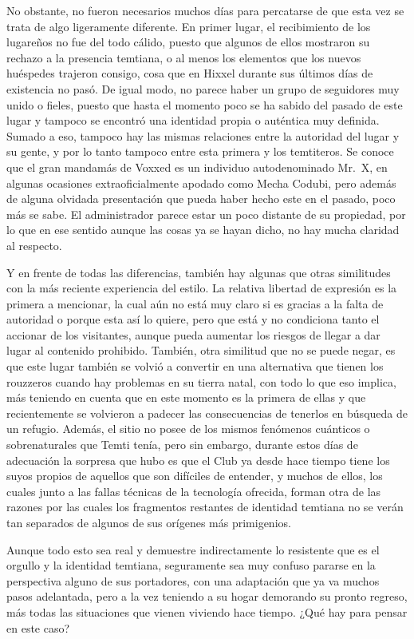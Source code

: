 \documentclass[
]{book}
\begin{document}
No obstante, no fueron necesarios muchos días para percatarse de que esta vez se trata de algo ligeramente diferente. En primer lugar, el recibimiento de los lugareños no fue del todo cálido, puesto que algunos de ellos mostraron su rechazo a la presencia temtiana, o al menos los elementos que los nuevos huéspedes trajeron consigo, cosa que en Hixxel durante sus últimos días de existencia no pasó. De igual modo, no parece haber un grupo de seguidores muy unido o fieles, puesto que hasta el momento poco se ha sabido del pasado de este lugar y tampoco se encontró una identidad propia o auténtica muy definida. Sumado a eso, tampoco hay las mismas relaciones entre la autoridad del lugar y su gente, y por lo tanto tampoco entre esta primera y los temtiteros. Se conoce que el gran mandamás de Voxxed es un individuo autodenominado Mr.~X, en algunas ocasiones extraoficialmente apodado como Mecha Codubi, pero además de alguna olvidada presentación que pueda haber hecho este en el pasado, poco más se sabe. El administrador parece estar un poco distante de su propiedad, por lo que en ese sentido aunque las cosas ya se hayan dicho, no hay mucha claridad al respecto.

Y en frente de todas las diferencias, también hay algunas que otras similitudes con la más reciente experiencia del estilo. La relativa libertad de expresión es la primera a mencionar, la cual aún no está muy claro si es gracias a la falta de autoridad o porque esta así lo quiere, pero que está y no condiciona tanto el accionar de los visitantes, aunque pueda aumentar los riesgos de llegar a dar lugar al contenido prohibido. También, otra similitud que no se puede negar, es que este lugar también se volvió a convertir en una alternativa que tienen los rouzzeros cuando hay problemas en su tierra natal, con todo lo que eso implica, más teniendo en cuenta que en este momento es la primera de ellas y que recientemente se volvieron a padecer las consecuencias de tenerlos en búsqueda de un refugio. Además, el sitio no posee de los mismos fenómenos cuánticos o sobrenaturales que Temti tenía, pero sin embargo, durante estos días de adecuación la sorpresa que hubo es que el Club ya desde hace tiempo tiene los suyos propios de aquellos que son difíciles de entender, y muchos de ellos, los cuales junto a las fallas técnicas de la tecnología ofrecida, forman otra de las razones por las cuales los fragmentos restantes de identidad temtiana no se verán tan separados de algunos de sus orígenes más primigenios.

Aunque todo esto sea real y demuestre indirectamente lo resistente que es el orgullo y la identidad temtiana, seguramente sea muy confuso pararse en la perspectiva alguno de sus portadores, con una adaptación que ya va muchos pasos adelantada, pero a la vez teniendo a su hogar demorando su pronto regreso, más todas las situaciones que vienen viviendo hace tiempo. ¿Qué hay para pensar en este caso?
\end{document}

